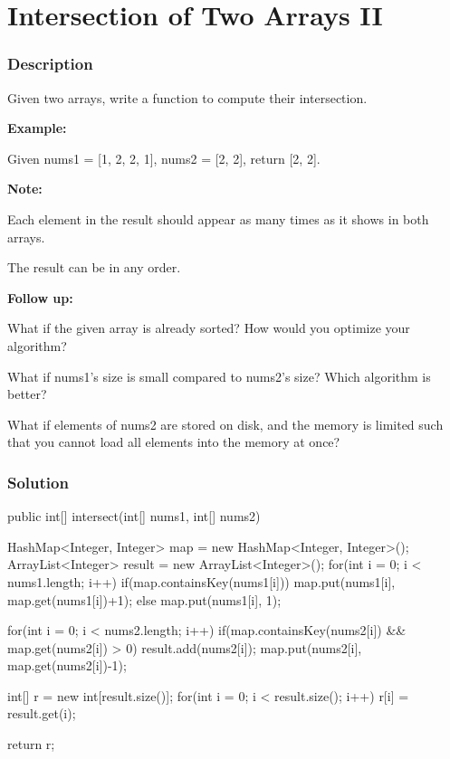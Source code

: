 \newpage

\section{Intersection of Two Arrays II} %

\subsubsection{Description}
Given two arrays, write a function to compute their intersection.

\textbf{Example:}

Given nums1 = [1, 2, 2, 1], nums2 = [2, 2], return [2, 2].

\textbf{Note:}

Each element in the result should appear as many times as it shows in both arrays.

The result can be in any order.

\textbf{Follow up:}

What if the given array is already sorted? How would you optimize your algorithm?

What if nums1's size is small compared to nums2's size? Which algorithm is better?

What if elements of nums2 are stored on disk, and the memory is limited such that you cannot load all elements into the memory at once?
\subsubsection{Solution}

\begin{Code}
public int[] intersect(int[] nums1, int[] nums2) {
    HashMap<Integer, Integer> map = new HashMap<Integer, Integer>();
    ArrayList<Integer> result = new ArrayList<Integer>();
    for(int i = 0; i < nums1.length; i++)
    {
        if(map.containsKey(nums1[i])) map.put(nums1[i], map.get(nums1[i])+1);
        else map.put(nums1[i], 1);
    }

    for(int i = 0; i < nums2.length; i++)
    {
        if(map.containsKey(nums2[i]) && map.get(nums2[i]) > 0)
        {
            result.add(nums2[i]);
            map.put(nums2[i], map.get(nums2[i])-1);
        }
    }

    int[] r = new int[result.size()];
    for(int i = 0; i < result.size(); i++)
    {
        r[i] = result.get(i);
    }

    return r;
}
\end{Code}

